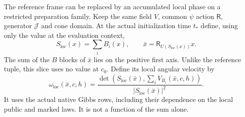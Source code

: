 The reference frame can be replaced by an accumulated local phase on a restricted preparation family. Keep the same field $V$, common $\psi$ action $\mathsf R$, generator $\mathcal J$ and cone domain. At the actual initialization time $t_*$ define, using only the value at the evaluation context,
\begin{equation}
 S_{\mathrm{loc}}(x)=\sum_i B_i(x),\qquad
 \bar x=\mathsf R_{U(S_{\mathrm{loc}}(x))}x.
 \label{lp:local-slice}
\end{equation}
The sum of the $B$ blocks of $\bar x$ lies on the positive first axis. Unlike the reference tuple, this slice uses no value at $c_0$. Define its local angular velocity by
\begin{equation}
 \omega_{\mathrm{loc}}(\bar x,c,h)
 =\frac{\det(S_{\mathrm{loc}}(\bar x),\sum_iV_{B_i}(\bar x,c,h))}
 {|S_{\mathrm{loc}}(\bar x)|^2}.
 \label{lp:local-angular-velocity}
\end{equation}
It uses the actual native Gibbs rows, including their dependence on the local public and marked laws. It is not a function of the sum alone.


